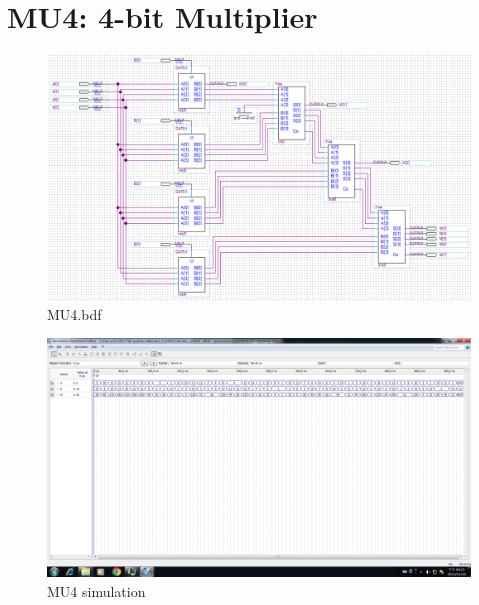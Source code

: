 \documentclass[12pt,a4paper]{article}
\begin{document}
  \section{MU4: 4-bit Multiplier}
  \begin{figure}[H]
    \centering
    \includegraphics[width=\linewidth]{MU4_bdf.png}
    \caption{MU4.bdf}
  \end{figure}
  \begin{figure}[H]
    \centering
    \includegraphics[width=\linewidth]{MU4_simulation.png}
    \caption{MU4 simulation}
  \end{figure}
\end{document}
